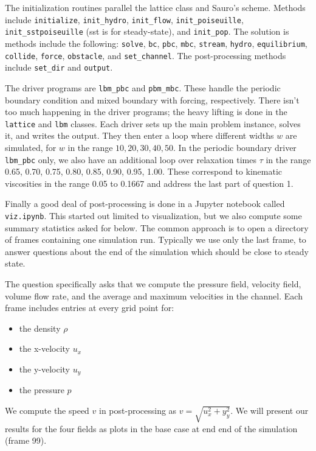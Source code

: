 \documentclass[11pt]{article}
\newcommand{\tty}[1]{\texttt{#1}}
\begin{document}
The initialization routines parallel the lattice class and Sauro's scheme.
Methods include \tty{initialize}, \tty{init\_hydro}, \tty{init\_flow}, 
\tty{init\_poiseuille}, \tty{init\_sstpoiseuille} (sst is for steady-state),
and \tty{init\_pop}.
The solution is methods include the following:
\tty{solve}, \tty{bc}, \tty{pbc}, \tty{mbc}, \tty{stream}, \tty{hydro},
\tty{equilibrium}, \tty{collide}, \tty{force}, \tty{obstacle}, and \tty{set\_channel}.
The post-processing methods include \tty{set\_dir} and \tty{output}.

The driver programs are \tty{lbm\_pbc} and \tty{pbm\_mbc}.  
These handle the periodic boundary condition and mixed boundary with forcing, respectively.
There isn't too much happening in the driver programs; 
the heavy lifting is done in the \tty{lattice} and \tty{lbm} classes.
Each driver sets up the main problem instance, solves it, and writes the output.
They then enter a loop where different widths $w$ are simulated, 
for $w$ in the range $10, 20, 30, 40, 50$.
In the periodic boundary driver \tty{lbm\_pbc} only, 
we also have an additional loop over relaxation times $\tau$ 
in the range 0.65, 0.70, 0.75, 0.80, 0.85, 0.90, 0.95, 1.00.
These correspond to kinematic viscosities in the range 0.05 to 0.1667
and address the last part of question 1.

Finally a good deal of post-processing is done in a Jupyter notebook called \tty{viz.ipynb}.
This started out limited to visualization, but we also compute 
some summary statistics asked for below.  
The common approach is to open a directory of frames containing one simulation run.
Typically we use only the last frame, to answer questions about the end of the 
simulation which should be close to steady state.

The question specifically asks that we compute the pressure field, velocity field,
volume flow rate, and the average and maximum velocities in the channel.
Each frame includes entries at every grid point for:
\begin{itemize}
\item the density $\rho$
\item the x-velocity $u_x$
\item the y-velocity $u_y$
\item the pressure $p$
\end{itemize}

We compute the speed $v$ in post-processing as $v = \sqrt{u_x^2 + y_y^2}$.
We will present our results for the four fields as plots in the base case at
end end of the simulation (frame 99).
\end{document}
